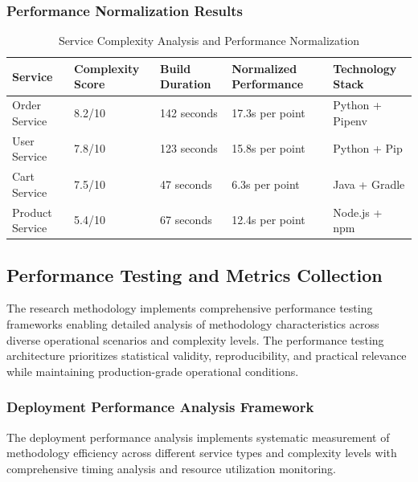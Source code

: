 \subsubsection{Performance Normalization Results}

\begin{table}[H]
\centering
\caption{Service Complexity Analysis and Performance Normalization}
\label{tab:complexity-performance-results}
\begin{tabular}{|p{3cm}|p{2cm}|p{2.5cm}|p{2.5cm}|p{3cm}|}
\hline
\textbf{Service} & \textbf{Complexity Score} & \textbf{Build Duration} & \textbf{Normalized Performance} & \textbf{Technology Stack} \\
\hline
Order Service & 8.2/10 & 142 seconds & 17.3s per point & Python + Pipenv \\
\hline
User Service & 7.8/10 & 123 seconds & 15.8s per point & Python + Pip \\
\hline
Cart Service & 7.5/10 & 47 seconds & 6.3s per point & Java + Gradle \\
\hline
Product Service & 5.4/10 & 67 seconds & 12.4s per point & Node.js + npm \\
\hline
\end{tabular}
\end{table}

\subsection{Performance Testing and Metrics Collection}

The research methodology implements comprehensive performance testing frameworks enabling detailed analysis of methodology characteristics across diverse operational scenarios and complexity levels. The performance testing architecture prioritizes statistical validity, reproducibility, and practical relevance while maintaining production-grade operational conditions.

\subsubsection{Deployment Performance Analysis Framework}

The deployment performance analysis implements systematic measurement of methodology efficiency across different service types and complexity levels with comprehensive timing analysis and resource utilization monitoring.

